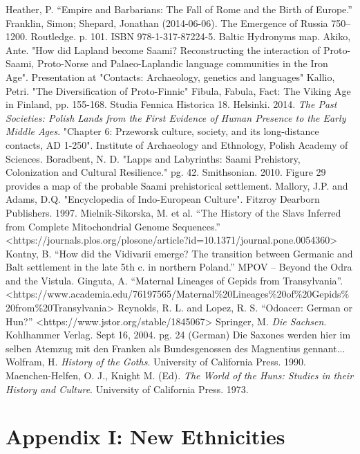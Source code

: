\documentclass{article}
\begin{document}
	\begin{thebibliography}{99}
		Heather, P. “Empire and Barbarians: The Fall of Rome and the Birth of Europe.”
		Franklin, Simon; Shepard, Jonathan (2014-06-06). The Emergence of Russia 750–1200. Routledge. p. 101. ISBN 978-1-317-87224-5.
		Baltic Hydronyms map.
		Akiko, Ante. "How did Lapland become Saami? Reconstructing the interaction of Proto-Saami, Proto-Norse and Palaeo-Laplandic language communities in the Iron Age". Presentation at "Contacts: Archaeology, genetics and languages"
		Kallio, Petri. "The Diversification of Proto-Finnic" Fibula, Fabula, Fact: The Viking Age in Finland, pp. 155-168. Studia Fennica Historica 18. Helsinki. 2014.
		\textit{The Past Societies: Polish Lands from the First Evidence of Human Presence to the Early Middle Ages}. "Chapter 6: Przeworsk culture, society, and its long-distance contacts, AD 1-250". Institute of Archaeology and Ethnology, Polish Academy of Sciences.
		Boradbent, N. D. "Lapps and Labyrinths:  Saami Prehistory, Colonization and Cultural Resilience." pg. 42. Smithsonian. 2010. \tiny Figure 29 provides a map of the probable Saami prehistorical settlement.
		\normalsize
		Mallory, J.P. and Adams, D.Q. "Encyclopedia of Indo-European Culture". Fitzroy Dearborn Publishers. 1997.
		Mielnik-Sikorska, M. et al. “The History of the Slavs Inferred from Complete Mitochondrial Genome Sequences.” <https://journals.plos.org/plosone/article?id=10.1371/journal.pone.0054360>
		Kontny, B. “How did the Vidivarii emerge? The transition between Germanic and Balt settlement in the late 5th c. in northern Poland.” MPOV – Beyond the Odra and the Vistula.
		Ginguta, A. “Maternal Lineages of Gepids from Transylvania”. <https://www.academia.edu/76197565/Maternal\%20Lineages\%20of\%20Gepids\%20from\%20Transylvania>
		Reynolds, R. L. and Lopez, R. S. “Odoacer: German or Hun?” <https://www.jstor.org/stable/1845067>
		Springer, M. \textit{Die Sachsen}. Kohlhammer Verlag. Sept 16, 2004. pg. 24 (German)
		\tiny Die Saxones werden hier im selben Atemzug mit den Franken als Bundesgenossen des Magnentius gennant...
		Wolfram, H. \textit{History of the Goths}. University of California Press. 1990.
		Maenchen-Helfen, O. J., Knight M. (Ed). \textit{The World of the Huns: Studies in their History and Culture}. University of California Press. 1973.
	\end{thebibliography}
	
	\newpage
	
	\section{Appendix I: New Ethnicities}
	\label{sec:appendix_new_ethnicities}
	
\end{document}
